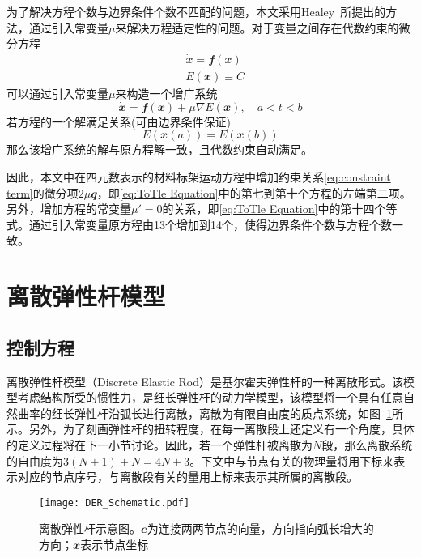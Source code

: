 为了解决方程个数与边界条件个数不匹配的问题，本文采用Healey~\cite{healey2005straightforward}所提出的方法，通过引入常变量$\mu$来解决方程适定性的问题。对于变量之间存在代数约束的微分方程
\begin{equation}
	\begin{split}
	&\dot{\mathbfit{x}}=\mathbfit{f}(\mathbfit{x})\\
	&E(\mathbfit{x})\equiv C
	\end{split}
	\end{equation}
可以通过引入常变量$\mu$来构造一个增广系统
\begin{equation}
		\dot{\mathbfit{x}}=\mathbfit{f}(\mathbfit{x})+\mu \nabla E(\mathbfit{x}), \quad a<t<b
\end{equation}
若方程的一个解满足关系(可由边界条件保证)
\begin{equation}
	E(\mathbfit{x}(a))=E(\mathbfit{x}(b))
\end{equation}
那么该增广系统的解与原方程解一致，且代数约束自动满足。

因此，本文中在四元数表示的材料标架运动方程中增加约束关系\eqref{eq:constraint term}的微分项$2\mu \mathbfit{q}$，即\eqref{eq:ToTle Equation}中的第七到第十个方程的左端第二项。另外，增加方程的常变量$\mu'=0$的关系，即\eqref{eq:ToTle Equation}中的第十四个等式。通过引入常变量原方程由13个增加到14个，使得边界条件个数与方程个数一致。

\section{离散弹性杆模型}
\subsection{控制方程}
离散弹性杆模型（Discrete Elastic Rod）是基尔霍夫弹性杆的一种离散形式。该模型考虑结构所受的惯性力，是细长弹性杆的动力学模型，该模型将一个具有任意自然曲率的细长弹性杆沿弧长进行离散，离散为有限自由度的质点系统，如图~\ref{fig:DER_Schematic}所示。另外，为了刻画弹性杆的扭转程度，在每一离散段上还定义有一个角度，具体的定义过程将在下一小节讨论。因此，若一个弹性杆被离散为$N$段，那么离散系统的自由度为$3(N+1)+N=4N+3$。下文中与节点有关的物理量将用下标来表示对应的节点序号，与离散段有关的量用上标来表示其所属的离散段。
\begin{figure}
	\centering
	\texttt{[image: DER\_Schematic.pdf]}
	\caption{离散弹性杆示意图。$\mathbfit{e}$为连接两两节点的向量，方向指向弧长增大的方向；$\mathbfit{x}$表示节点坐标}
	\label{fig:DER_Schematic}
\end{figure}

